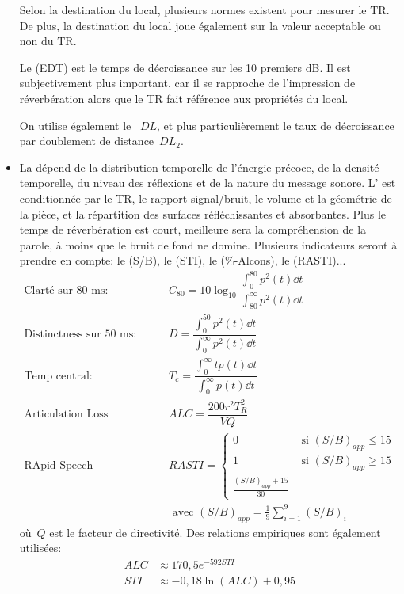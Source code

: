 \begin{itemize}
Selon la destination du local, plusieurs normes existent pour mesurer le TR. De plus, la destination du local joue également sur la valeur acceptable ou non du TR.

Le  (EDT) est le temps de décroissance sur les 10 premiers dB. Il est subjectivement plus important, car il se rapproche de l'impression de réverbération alors que le TR fait référence aux propriétés du local.

   On utilise également le ~$DL$, et plus particulièrement le taux de décroissance par doublement de distance~$DL_2$.

   \item La  dépend de la distribution temporelle de l'énergie précoce, de la densité temporelle, du niveau des réflexions et de la nature du message sonore. 
   L' est conditionnée par le TR, le rapport signal/bruit, le volume et la géométrie de la pièce, et la répartition des surfaces réfléchissantes et absorbantes.
   Plus le temps de réverbération est court, meilleure sera la compréhension de la parole, à moins que le bruit de fond ne domine.
   Plusieurs indicateurs seront à prendre en compte: le  (S/B), le  (STI), le  (\%-Alcons), le  (RASTI)...
   \begin{align*}
   \text{Clarté sur 80~ms: } & C_{80}=10\log_{10}\dfrac{\int_0^{80}p^2(t)\dd t}{\int_{80}^\infty p^2(t)\dd t}\\
   \text{Distinctness sur 50~ms: } & D = \dfrac{\int_0^{50}p^2(t)\dd t}{\int_{0}^\infty p^2(t)\dd t}\\
   \text{Temp central: } & T_c = \dfrac{\int_0^\infty tp(t)\dd t}{\int_0^\infty p(t)\dd t}\\
   \text{Articulation Loss Consonent: } & ALC=\dfrac{200 r^2T_R^2}{VQ}\\
   \text{RApid Speech Transmission Index: } & RASTI =
   \left\{\begin{array}{ll}
   0 & \text{ si } (S/B)_{app}\le 15\\
   1 & \text{ si } (S/B)_{app}\ge 15\\
   \frac{(S/B)_{app}+15}{30}
   \end{array}
   \right.\\
   & \text{ avec } (S/B)_{app}=\frac19\sum_{i=1}^9 (S/B)_i
   \end{align*}
   où~$Q$ est le facteur de directivité.   
   Des relations empiriques sont également utilisées:
   \begin{align*}
    ALC &\approx 170,5 e^{-592 STI} \\
    STI &\approx -0,18 \ln(ALC) + 0,95
   \end{align*}


\end{itemize}
